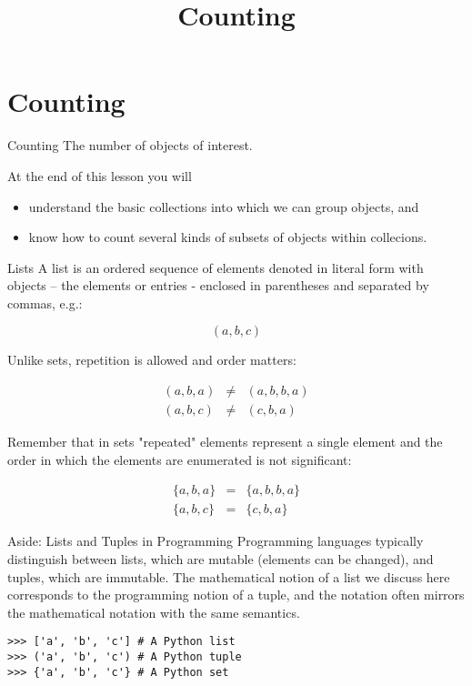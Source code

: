 \documentclass[smaller]{beamer}
\date{}
\title{Counting}
\begin{document}
\maketitle

\section{Counting}
\label{sec:orgf37822b}

\begin{frame}[label={sec:org40b299d}]{Counting}
The number of objects of interest.

At the end of this lesson you will

\begin{itemize}
\item understand the basic collections into which we can group objects, and
\item know how to count several kinds of subsets of objects within collecions.
\end{itemize}
\end{frame}

\begin{frame}[label={sec:org7196737}]{Lists}
A list is an ordered sequence of elements denoted in literal form with objects -- the elements or entries - enclosed in parentheses and separated by commas, e.g.:

$$
(a, b, c)
$$

Unlike sets, repetition is allowed and order matters:

\begin{eqnarray*}
(a, b, a)   & \ne & (a, b, b, a)\\
(a, b, c)   & \ne & (c, b, a)
\end{eqnarray*}

Remember that in sets "repeated" elements represent a single element and the order in which the elements are enumerated is not significant:

\begin{eqnarray*}
\{a, b, a\} & = & \{a, b, b, a\}\\
\{a, b, c\} & = & \{c, b, a\}
\end{eqnarray*}
\end{frame}

\begin{frame}[label={sec:org0555484},fragile]{Aside: Lists and Tuples in Programming}
 Programming languages typically distinguish between \alert{lists}, which are mutable (elements can be changed), and \alert{tuples}, which are immutable.  The mathematical notion of a list we discuss here corresponds to the programming notion of a tuple, and the notation often mirrors the mathematical notation with the same semantics.

\lstset{language=Python,label= ,caption= ,captionpos=b,numbers=none}
\begin{lstlisting}
>>> ['a', 'b', 'c'] # A Python list
>>> ('a', 'b', 'c') # A Python tuple
>>> {'a', 'b', 'c'} # A Python set
\end{lstlisting}
\end{frame}
\end{document}
